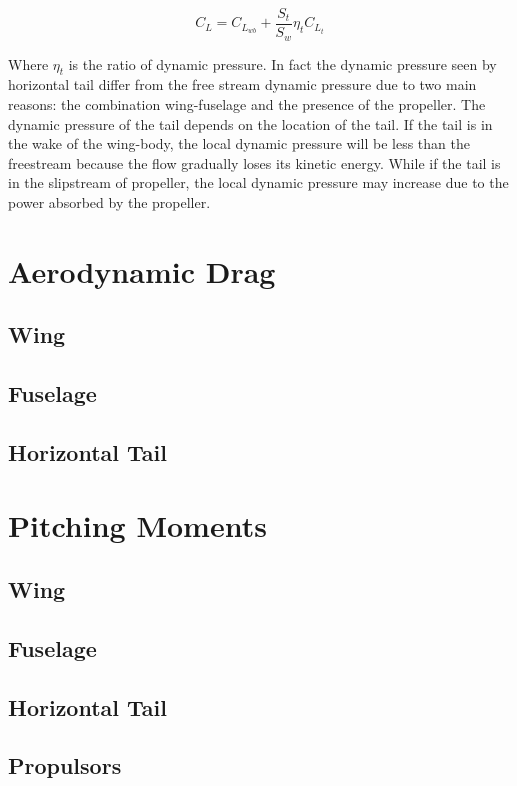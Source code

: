 \begin{equation}
C_L = C_{L_{wb}} + \frac{S_t}{S_w} \eta_t C_{L_{t}}
\end{equation}

Where $\eta_t$ is the ratio of dynamic pressure. In fact the dynamic pressure seen by horizontal tail differ from the free stream dynamic pressure due to two main reasons: the combination wing-fuselage and the presence of the propeller. The dynamic pressure of the tail depends on the location of the tail. If the tail is in the wake of the wing-body, the local dynamic pressure will be less than the freestream because the flow gradually loses its kinetic energy. While if the tail is in the slipstream of propeller, the local dynamic pressure may increase due to the power absorbed by the propeller.



\section{Aerodynamic Drag}
\subsection{Wing}
\subsection{Fuselage}
\subsection{Horizontal Tail}
\section{Pitching Moments}
\subsection{Wing}
\subsection{Fuselage}
\subsection{Horizontal Tail}
\subsection{Propulsors}

